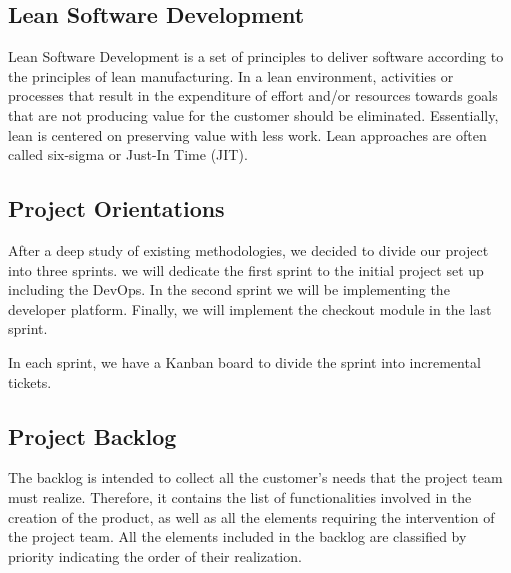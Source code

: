 \begin{spacing}{1.2}
\subsection{Lean Software Development}

Lean Software Development \cite{lean} is a set of principles to deliver software according to the principles of lean manufacturing. In a lean environment, activities or processes that result in the expenditure of effort and/or resources towards goals that are not producing value for the customer should be eliminated. Essentially, lean is centered on preserving value with less work. Lean approaches are often called six-sigma or Just-In Time (JIT).

\subsection{Project Orientations}
After a deep study of existing methodologies, we decided to divide our project into three sprints.
we will dedicate the first sprint to the initial project set up including the DevOps. In the second sprint we will be implementing the developer platform. Finally, we will implement the checkout module in the last sprint.

In each sprint, we have a Kanban board to divide the sprint into incremental tickets.

\subsection{Project Backlog}
The backlog is intended to collect all the customer's needs that the project team must realize. Therefore, it contains the list of functionalities involved in the creation of the product, as well as all the elements requiring the intervention of the project team. All the elements included in the backlog are classified by priority indicating the order of their realization.
\newpage





\end{spacing}
